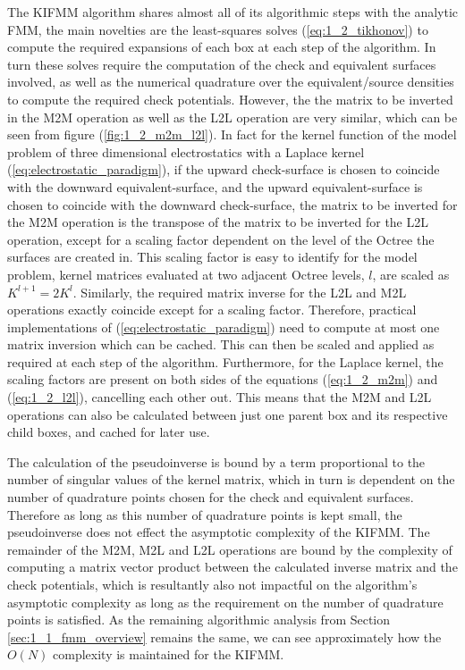 The \gls{KIFMM} algorithm shares almost all of its algorithmic steps with the analytic \gls{FMM}, the
main novelties are the least-squares solves (\ref{eq:1_2_tikhonov}) to compute
the required expansions of each box at each step of the algorithm. In turn
these solves require the computation of the check and equivalent surfaces involved,
as well as the numerical quadrature over the equivalent/source densities to compute
the required check potentials. However, the the matrix to be inverted
in the \gls{M2M} operation as well as the \gls{L2L} operation are very similar, which can
be seen from figure (\ref{fig:1_2_m2m_l2l}). In fact for the kernel function of
the model problem  of three dimensional electrostatics with a Laplace kernel (\ref{eq:electrostatic_paradigm}), if
the upward \gls{check-surface} is chosen to coincide with the downward
\gls{equivalent-surface}, and the upward \gls{equivalent-surface} is chosen to
coincide with the downward \gls{check-surface}, the matrix to be inverted for the M2M
operation is the transpose of the matrix to be inverted for the \gls{L2L} operation,
except for a scaling factor dependent on the level of the Octree the surfaces
are created in. This scaling factor is easy to identify for the model problem,
kernel matrices evaluated at two adjacent Octree levels, $l$, are scaled as $K^{l+1} = 2K^l$.
Similarly, the required matrix inverse for the \gls{L2L} and \gls{M2L} operations exactly coincide
except for a scaling factor. Therefore, practical implementations of (\ref{eq:electrostatic_paradigm})
need to compute at most one matrix inversion which can be cached. This can then
be scaled and applied as required at each step of the algorithm. Furthermore,
for the Laplace kernel, the scaling factors are present on both sides
of the equations (\ref{eq:1_2_m2m}) and (\ref{eq:1_2_l2l}), cancelling each other out.
This means that the \gls{M2M} and \gls{L2L} operations can also be calculated between just one
parent box and its respective child boxes, and cached for later use.

The calculation of the pseudoinverse is bound
by a term proportional to the number of singular values of the kernel
matrix, which in turn is dependent on the number of quadrature points chosen for
the check and equivalent surfaces. Therefore as long as this number of quadrature
points is kept small, the pseudoinverse does not effect the asymptotic complexity
of the \gls{KIFMM}. The remainder of the \gls{M2M}, \gls{M2L} and \gls{L2L} operations are bound by
the complexity of computing a matrix vector product between the calculated inverse
matrix and the check potentials, which is resultantly also not impactful on the
algorithm's asymptotic complexity as long as the requirement on the number of
quadrature points is satisfied. As the remaining algorithmic analysis from
Section \ref{sec:1_1_fmm_overview} remains the same, we can see approximately how
the $O(N)$ complexity is maintained for the \gls{KIFMM}.

